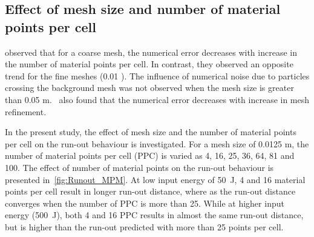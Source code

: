 \subsection{Effect of mesh size and number of material points per cell}
\label{sec:MPM_points_per_cell}

\citet{Abe2013} observed that for a coarse mesh, the numerical error 
decreases with increase in the number of material points per cell. In contrast, 
they observed an opposite trend for the fine meshes (0.01 ). The 
influence of numerical noise due to particles crossing the background mesh was 
not observed when the mesh size is greater than 0.05 
\si{\m}.~\citet{Coetzee2005} also found that the numerical error decreases with 
increase in mesh refinement.

In the present study, the effect of mesh size and the number of material points 
per cell on the run-out behaviour is investigated. For a mesh size of 0.0125 
\si{\m}, the number of material points per cell (PPC) is varied as 4, 16, 25, 
36, 64, 
81 and 100. The effect of number of material points on the run-out behaviour is 
presented in~\cref{fig:Runout_MPM}. At low input energy of 50~\si{\J}, 4 and 16 
material points per cell result in longer run-out distance, where as the 
run-out distance converges when the number of PPC is more 
than 25. While at higher input energy (500~\si{J}), both 4 and 16 PPC results 
in almost the same run-out distance, but is higher than the run-out predicted 
with more than 25 points per cell. 

